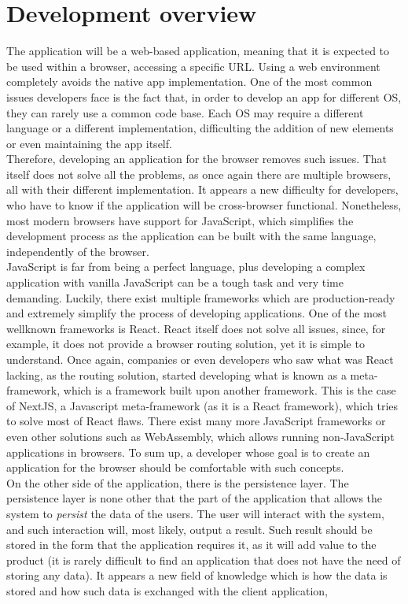 \documentclass[a4paper, 12pt, oneside]{book}
\begin{document}
\section{Development overview}
The application will be a web-based application, meaning that it is expected to be used within a browser, accessing a specific URL. Using a web environment completely avoids the native app implementation. One of the most common issues developers face is the fact that, in order to develop an app for different OS, they can rarely use a common code base. Each OS may require a different language or a different implementation, difficulting the addition of new elements or even maintaining the app itself.
\\[8pt]
Therefore, developing an application for the browser removes such issues. That itself does not solve all the problems, as once again there are multiple browsers, all with their different implementation. It appears a new difficulty for developers, who have to know if the application will be cross-browser functional. Nonetheless, most modern browsers have support for JavaScript, which simplifies the development process as the application can be built with the same language, independently of the browser.
\\[8pt]
JavaScript is far from being a perfect language, plus developing a complex application with vanilla JavaScript can be a tough task and very time demanding. Luckily, there exist multiple frameworks which are production-ready and extremely simplify the process of developing applications. One of the most wellknown frameworks is React. React itself does not solve all issues, since, for example, it does not provide a browser routing solution, yet it is simple to understand. Once again, companies or even developers who saw what was React lacking, as the routing solution, started developing what is known as a meta-framework, which is a framework built upon another framework. This is the case of NextJS, a Javascript meta-framework (as it is a React framework), which tries to solve most of React flaws. There exist many more JavaScript frameworks or even other solutions such as WebAssembly, which allows running non-JavaScript applications in browsers. To sum up, a developer whose goal is to create an application for the browser should be comfortable with such concepts.
\\[8pt]
On the other side of the application, there is the persistence layer. The persistence layer is none other that the part of the application that allows the system to \emph{persist} the data of the users. The user will interact with the system, and such interaction will, most likely, output a result. Such result should be stored in the form that the application requires it, as it will add value to the product (it is rarely difficult to find an application that does not have the need of storing any data). It appears a new field of knowledge which is how the data is stored and how such data is exchanged with the client application,
\end{document}
